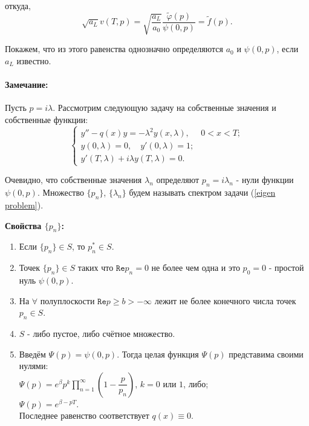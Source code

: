 \documentclass{article}
\newenvironment{observation}{ \paragraph{Замечание:}}{\\}
\begin{document}
откуда,
\begin{equation}
\sqrt{a_L} v(T,p) = \sqrt{\dfrac{a_L}{a_0}} \dfrac{\tilde{\varphi}(p)}{\psi(0,p)} = \tilde{f}(p).
\end{equation}

Покажем, что из этого равенства однозначно определяются $a_0$ и $\psi(0,p)$, если $a_L$ известно.

\begin{observation}
Пусть $p = i \lambda$. 
Рассмотрим следующую задачу на собственные значения и собственные функции:
\begin{equation}
\begin{cases}
	y'' - q(x) y = -\lambda^2 y(x,\lambda), & 0<x<T;\\
	y(0,\lambda) = 0, \quad  y'(0,\lambda) = 1;\\
	y'(T,\lambda) + i \lambda y(T,\lambda) = 0.
\end{cases}
\label{eigen problem}
\end{equation}

Очевидно, что собственные значения $\lambda_n$ определяют $p_n = i\lambda_n$ - нули функции $\psi(0,p)$.
Множество $\{p_n\}$, $\{\lambda_n\}$ будем называть спектром задачи (\ref{eigen problem}).
\end{observation}

\textbf{Свойства $\{p_n\}$:}
\begin{enumerate}
	\item Если $\{p_n\} \in S$, то $p_n^* \in S$.
	\item Точек $\{p_n\} \in S$ таких что $ \texttt{Re} p_n = 0$ не более чем одна и это $p_0 = 0$ - простой нуль $\psi(0,p)$.
	\item На $\forall$ полуплоскости $ \texttt{Re} p \geqslant b > -\infty$ лежит не более конечного числа точек $p_n \in S$.
	\item $S$ - либо пустое, либо счётное множество.
	\item Введём $\Psi(p) = \psi(0,p)$. Тогда целая функция $\Psi(p)$ представима своими нулями: \\
	$\Psi(p) = e^{\beta} p^k \prod_{n = 1}^{\infty} ( 1 - \dfrac{p}{p_n})$, $ k = 0$ или $1$, либо;\\
	$\Psi(p) = e^{\beta - pT}$.\\
	Последнее равенство соответствует $q(x) \equiv 0$.
\end{enumerate}
\end{document}
